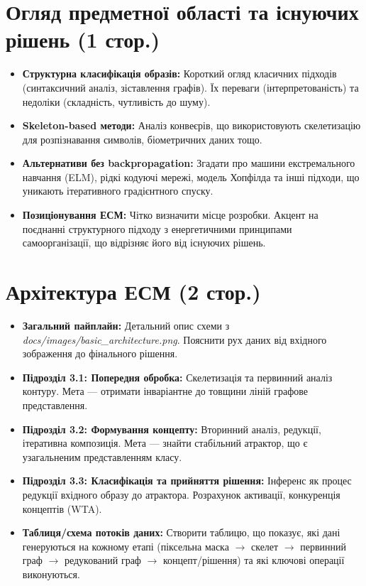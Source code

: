 \documentclass[12pt, a4paper]{article}
\begin{document}
\section{Огляд предметної області та існуючих рішень (1 стор.)}
\begin{itemize}
    \item \textbf{Структурна класифікація образів:} Короткий огляд класичних підходів (синтаксичний аналіз, зіставлення графів). Їх переваги (інтерпретованість) та недоліки (складність, чутливість до шуму).
    \item \textbf{Skeleton-based методи:} Аналіз конвеєрів, що використовують скелетизацію для розпізнавання символів, біометричних даних тощо.
    \item \textbf{Альтернативи без backpropagation:} Згадати про машини екстремального навчання (ELM), рідкі кодуючі мережі, модель Хопфілда та інші підходи, що уникають ітеративного градієнтного спуску.
    \item \textbf{Позиціонування ЕСМ:} Чітко визначити місце розробки. Акцент на поєднанні структурного підходу з енергетичними принципами самоорганізації, що відрізняє його від існуючих рішень.
\end{itemize}

\section{Архітектура ЕСМ (2 стор.)}
\begin{itemize}
    \item \textbf{Загальний пайплайн:} Детальний опис схеми з \textit{docs/images/basic\_architecture.png}. Пояснити рух даних від вхідного зображення до фінального рішення.
    \item \textbf{Підрозділ 3.1: Попередня обробка:} Скелетизація та первинний аналіз контуру. Мета — отримати інваріантне до товщини ліній графове представлення.
    \item \textbf{Підрозділ 3.2: Формування концепту:} Вторинний аналіз, редукції, ітеративна композиція. Мета — знайти стабільний атрактор, що є узагальненим представленням класу.
    \item \textbf{Підрозділ 3.3: Класифікація та прийняття рішення:} Інференс як процес редукції вхідного образу до атрактора. Розрахунок активації, конкуренція концептів (WTA).
    \item \textbf{Таблиця/схема потоків даних:} Створити таблицю, що показує, які дані генеруються на кожному етапі (піксельна маска $\rightarrow$ скелет $\rightarrow$ первинний граф $\rightarrow$ редукований граф $\rightarrow$ концепт/рішення) та які ключові операції виконуються.
\end{itemize}
\end{document}
